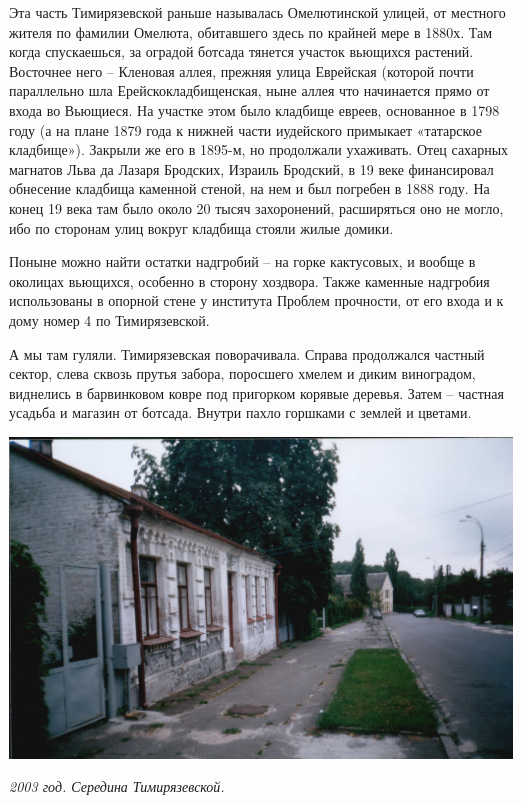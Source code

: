 Эта часть Тимирязевской раньше называлась Омелютинской улицей, от местного жителя по фамилии Омелюта, обитавшего здесь по крайней мере в 1880х. Там когда спускаешься, за оградой ботсада тянется участок вьющихся растений. Восточнее него – Кленовая аллея, прежняя улица Еврейская (которой почти параллельно шла Ерейскокладбищенская, ныне аллея что начинается прямо от входа во Вьющиеся. На участке этом было кладбище евреев, основанное в 1798 году (а на плане 1879 года к нижней части иудейского примыкает «татарское кладбище»). Закрыли же его в 1895-м, но продолжали ухаживать. Отец сахарных магнатов Льва да Лазаря Бродских, Израиль Бродский, в 19 веке финансировал обнесение кладбища каменной стеной, на нем и был погребен в 1888 году. На конец 19 века там было около 20 тысяч захоронений, расширяться оно не могло, ибо по сторонам улиц вокруг кладбища стояли жилые домики.

Поныне можно найти остатки надгробий – на горке кактусовых, и вообще в околицах вьющихся, особенно в сторону хоздвора. 
Также каменные надгробия использованы в опорной стене у института Проблем прочности, от его входа и к дому номер 4 по Тимирязевской.

А мы там гуляли. Тимирязевская поворачивала. Справа продолжался частный сектор, слева сквозь прутья забора, поросшего хмелем и диким виноградом, виднелись в барвинковом ковре под пригорком корявые деревья. Затем – частная усадьба и магазин от ботсада. Внутри пахло горшками с землей и цветами.

\begin{center}
\includegraphics[width=\linewidth]{chast-vosp/zver/out0014.jpg}

\textit{2003 год. Середина Тимирязевской.}
\end{center}

